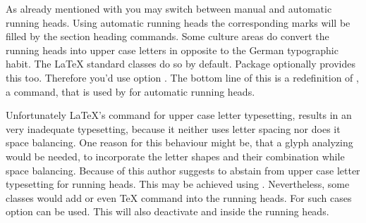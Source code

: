 \ifshortversion\IgnoreThistrue{}\fi
\ifIgnoreThis %
\else %
\begin{Declaration}
\end{Declaration}
%
As already mentioned with  you may switch between manual and
automatic running heads. Using automatic running heads the corresponding marks
will be filled by the section heading commands. Some culture areas do convert
the running heads into upper case letters in opposite to the German
typographic habit. The \LaTeX{} standard classes do so by default. Package
 optionally provides this too. Therefore you'd use option
. The bottom line of this is a redefinition of
, a command, that is
used by  for automatic running heads.

Unfortunately \LaTeX's command for upper case letter typesetting,
 results in an very inadequate
typesetting, because it neither uses letter spacing nor does it space
balancing. One reason for this behaviour might be, that a glyph analyzing
would be needed, to incorporate the letter shapes and their combination while
space balancing. Because of this \KOMAScript{} author suggests to abstain from
upper case letter typesetting for running heads. This may be achieved using
. Nevertheless, some classes would add
 or even \TeX{} command  into the
running heads. For such cases option  can be
used. This will also deactivate  and 
inside the running heads.


